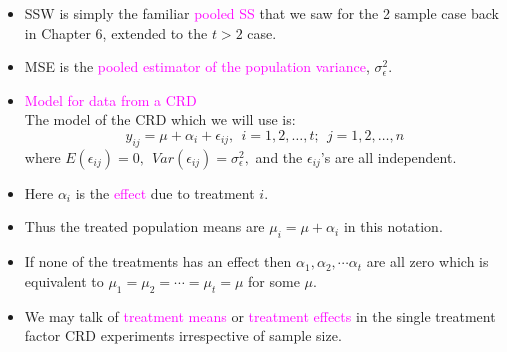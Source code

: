 \documentclass[xcolor=dvipsnames,12pt]{beamer}
\begin{document}
\begin{frame}
\begin{itemize}
\item SSW is simply the familiar \textcolor{magenta}{pooled SS} that we saw for the 
2 sample case back in Chapter 6, extended to the  $t > 2$ case.
\item MSE is the \textcolor{magenta}{pooled estimator of the population variance}, $\sigma^2_{\epsilon}$.

\item \textcolor{magenta}{Model for data from a CRD}\\[.1in]
The model of the CRD  which we will use is:
  $$y_{ij} = \mu + \alpha_i + \epsilon_{ij},\ \  i=1,2,\ldots,t; \ \
              j=1,2,\ldots,n$$
where $E(\epsilon_{ij}) = 0,\ \  Var(\epsilon_{ij}) = \sigma_\epsilon^2,$
and the $\epsilon_{ij}$'s are all independent.
\item Here  $ \alpha_i$ is the \textcolor{magenta}{ effect} due to
treatment $i$.  
\end{itemize}
\end{frame}



\begin{frame}
\begin{itemize}
\item Thus the treated population means are $\mu_i = \mu +
\alpha_i$ in this notation.
\item If  none of the treatments has an effect then $\alpha_1, \alpha_2, \cdots \alpha_t$ are all zero which
is equivalent to $\mu_1 = \mu_2 = \cdots = \mu_t = \mu$ for some $\mu$.
\item We may talk of \textcolor{magenta}{treatment means} or \textcolor{magenta}{treatment effects} in the single
treatment factor CRD experiments irrespective of sample size.
\end{itemize}
\end{frame}
\end{document}
